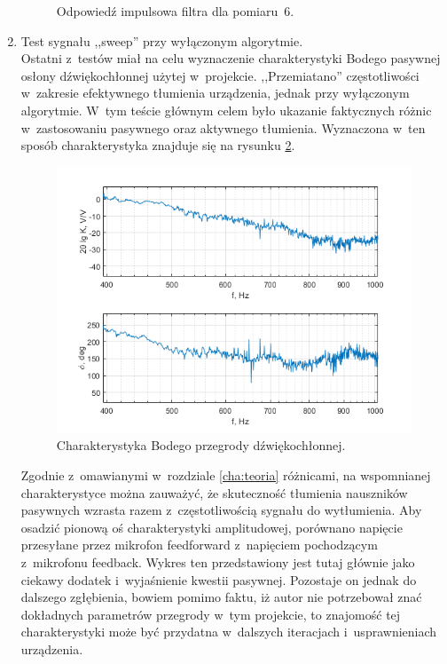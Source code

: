 \begin{enumerate}
\begin{figure}[h!]
		\caption{Odpowiedź impulsowa filtra dla pomiaru~6.}
		\label{fig:test_6_lms}
\end{figure}
	\item Test sygnału ,,sweep'' przy wyłączonym algorytmie.\\
	Ostatni z~testów miał na celu wyznaczenie charakterystyki Bodego pasywnej osłony dźwiękochłonnej użytej w~projekcie. ,,Przemiatano'' częstotliwości w~zakresie efektywnego tłumienia urządzenia, jednak przy wyłączonym algorytmie. W~tym teście głównym celem było ukazanie faktycznych różnic w~zastosowaniu pasywnego oraz aktywnego tłumienia. Wyznaczona w~ten sposób charakterystyka znajduje się na rysunku \ref{fig:bode}.
	\begin{figure}[h!]
		\centering
		\includegraphics[scale=0.9]{../Assets/bode_przegrode.png}
		\caption{Charakterystyka Bodego przegrody dźwiękochłonnej.}
		\label{fig:bode}
	\end{figure}

Zgodnie z~omawianymi w~rozdziale \ref{cha:teoria} różnicami, na wspomnianej charakterystyce można zauważyć, że skuteczność tłumienia nauszników pasywnych wzrasta razem z~częstotliwością sygnału do wytłumienia. Aby osadzić pionową oś charakterystyki amplitudowej, porównano napięcie przesyłane przez mikrofon feedforward z~napięciem pochodzącym z~mikrofonu feedback. Wykres ten przedstawiony jest tutaj głównie jako ciekawy dodatek i~wyjaśnienie kwestii pasywnej. Pozostaje on jednak do dalszego zgłębienia, bowiem pomimo faktu, iż autor nie potrzebował znać dokładnych parametrów przegrody w~tym projekcie, to znajomość tej charakterystyki może być przydatna w~dalszych iteracjach i~usprawnieniach urządzenia.
\end{enumerate}

